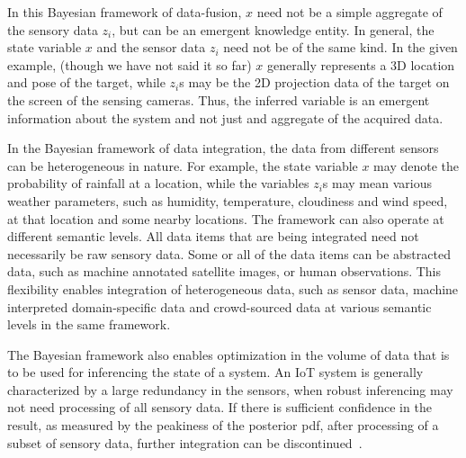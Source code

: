 In this Bayesian framework of data-fusion, $x$ need not be a simple aggregate of the sensory data $z_i$, but can be an emergent
knowledge entity. In general, the state variable $x$ and the sensor data $z_i$ need not be of the same kind. In the given example, 
(though we have not said it so far) $x$ generally represents a 3D location and pose of the target, while $z_i$s may be the 
2D projection data of the target on the screen of the sensing cameras. Thus, the inferred variable is an emergent information about 
the system and not just and aggregate of the acquired data. 

In the Bayesian framework of data integration, the data from different sensors can be heterogeneous in nature. For example, the state 
variable $x$ may denote the probability of rainfall at a location, while the variables $z_i$s may mean various weather parameters, such 
as humidity, temperature, cloudiness and wind speed, at that location and some nearby locations. The framework can also operate at 
different semantic levels. All data items that are being integrated need not necessarily be raw sensory data. Some or all of the data 
items can be abstracted data, such as machine annotated satellite images, or human observations. This flexibility enables integration 
of heterogeneous data, such as sensor data, machine interpreted domain-specific data and crowd-sourced data at various semantic
levels in the same framework. 

The Bayesian framework also enables optimization in the volume of data that is to be used for inferencing the state of a system. 
An IoT system is generally characterized by a large redundancy in the sensors, when robust inferencing may not need processing 
of all sensory data. If there is sufficient confidence in the result, as measured by the peakiness of the posterior pdf, after 
processing of a subset of sensory data, further integration can be discontinued~\citep{Ghosh:2004}.


